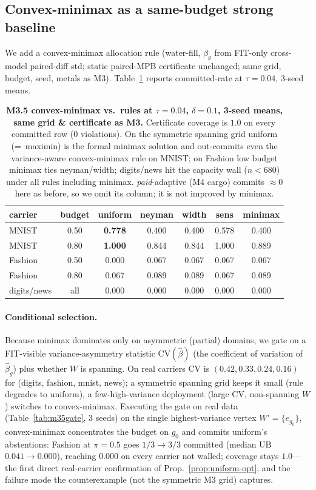 \documentclass{article}
\begin{document}
\subsection{Convex-minimax as a same-budget strong baseline}
We add a convex-minimax allocation rule (water-fill, $\beta_g$ from FIT-only cross-model
paired-diff std; static paired-MPB certificate unchanged; same grid, budget, seed, metals as
M3). Table~\ref{tab:m35} reports committed-rate at $\tau{=}0.04$, 3-seed means.
\begin{table}[t]
\centering\small\setlength{\tabcolsep}{4pt}
\begin{tabular}{lcccccc}
\toprule
carrier & budget & uniform & neyman & width & sens & minimax \\
\midrule
MNIST & 0.50 & \textbf{0.778} & 0.400 & 0.400 & 0.578 & 0.400 \\
MNIST & 0.80 & \textbf{1.000} & 0.844 & 0.844 & 1.000 & 0.889 \\
Fashion & 0.50 & 0.000 & 0.067 & 0.067 & 0.067 & 0.067 \\
Fashion & 0.80 & 0.067 & 0.089 & 0.089 & 0.067 & 0.089 \\
digits/news & all & 0.000 & 0.000 & 0.000 & 0.000 & 0.000 \\
\bottomrule
\end{tabular}
\caption{\textbf{M3.5 convex-minimax vs.\ rules at $\tau{=}0.04$, $\delta{=}0.1$, 3-seed
means, same grid \& certificate as M3.} Certificate coverage is $1.0$ on every committed row
(0 violations). On the symmetric spanning grid uniform (=\ maximin) is the formal minimax
solution and out-commits even the variance-aware convex-minimax rule on MNIST; on Fashion
low budget minimax ties neyman/width; digits/news hit the capacity wall ($n<680$) under all
rules including minimax. \emph{paid}-adaptive (M4 cargo) commits $\approx0$ here as before,
so we omit its column; it is not improved by minimax.}
\label{tab:m35}
\end{table}

\paragraph{Conditional selection.} Because minimax dominates only on asymmetric (partial)
domains, we gate on a FIT-visible variance-asymmetry statistic $\mathrm{CV}(\hat\beta)$ (the
coefficient of variation of $\hat\beta_g$) plus whether $W$ is spanning. On real carriers
$\mathrm{CV}$ is $(0.42,0.33,0.24,0.16)$ for (digits, fashion, mnist, news); a symmetric
spanning grid keeps it small (rule degrades to uniform), a few-high-variance deployment
(large $\mathrm{CV}$, non-spanning $W$) switches to convex-minimax. Executing the gate on
real data (Table~\ref{tab:m35gate}, 3 seeds) on the single highest-variance vertex
$W'=\{e_{g_0}\}$, convex-minimax concentrates the budget on $g_0$ and commits uniform's
abstentions: Fashion at $\pi{=}0.5$ goes $1/3\to3/3$ committed (median $\mathrm{UB}$
$0.041\to0.000$), reaching $0.000$ on every carrier not walled; coverage stays $1.0$---the
first direct real-carrier confirmation of Prop.~\ref{prop:uniform-opt}, and the failure mode
the counterexample (not the symmetric M3 grid) captures.
\end{document}
